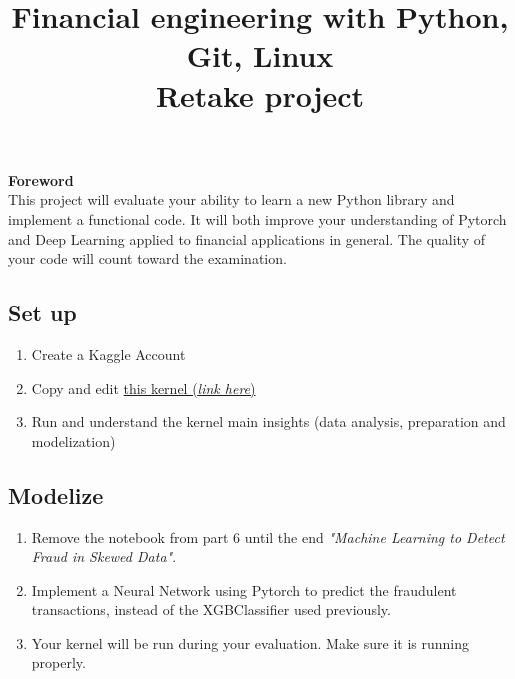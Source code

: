 
\setcounter{section}{4}



\title{Financial engineering with Python, Git, Linux\\
        Retake project}

\textbf{Foreword}\\

This project will evaluate your ability to learn a new Python library and implement a functional code. It will both improve your understanding of Pytorch and Deep Learning applied to financial applications in general. The quality of your code will count toward the examination.

\subsection{Set up}

\begin{enumerate}
    \item Create a Kaggle Account
    \item Copy and edit \href{https://www.kaggle.com/arjunjoshua/predicting-fraud-in-financial-payment-services}{this kernel (\textit{link here})}
    \item Run and understand the kernel main insights (data analysis, preparation and modelization)
\end{enumerate}

\subsection{Modelize}

\begin{enumerate}
    \item Remove the notebook from part 6 until the end \textit{"Machine Learning to Detect Fraud in Skewed Data"}.
    \item Implement a Neural Network using Pytorch to predict the fraudulent transactions, instead of the XGBClassifier used previously.
    \item Your kernel will be run during your evaluation. Make sure it is running properly.
\end{enumerate}



